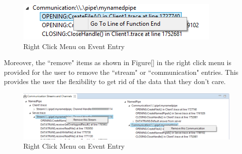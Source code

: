 \begin{figure}[H]
\centerline{\includegraphics[scale=0.7]{Figures/gotoend}}
 \caption{Right Click Menu on Event Entry}
\label{idenview}
\end{figure}

Moreover, the ``remove" items as shown in Figure\ref{} in the right click menu is provided for the user to remove the ``stream" or ``communication" entries. This provides the user the flexibility to get rid of the data that they don't care.

\begin{figure}[H]
\centerline{\includegraphics[scale=0.7]{Figures/remove}}
 \caption{Right Click Menu on Event Entry}
\label{idenview}
\end{figure}


